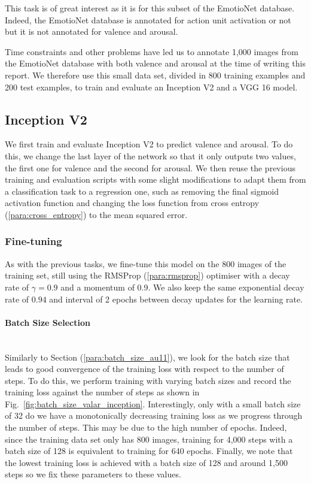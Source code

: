 \documentclass[12pt,twoside]{article}
\newcommand{\para}[1]{\paragraph{#1}\mbox{}\\}
\begin{document}
This task is of great interest as it is for this subset of the EmotioNet
database. Indeed, the EmotioNet database is annotated for action unit
activation or not but it is not annotated for valence and arousal.

Time constraints and other problems have led us to annotate 1,000 images from
the EmotioNet database with both valence and arousal at the time of writing
this report. We therefore use this small data set, divided in 800 training
examples and 200 test examples, to train and evaluate an Inception V2 and a VGG
16 model.

\subsection{Inception V2}\label{sec:valar_inception_v2}

We first train and evaluate Inception V2 to predict valence and arousal. To do
this, we change the last layer of the network so that it only outputs two
values, the first one for valence and the second for arousal. We then reuse
the previous training and evaluation scripts with some slight modifications to
adapt them from a classification task to a regression one, such as removing the
final sigmoid activation function and changing the loss function from cross
entropy (\ref{para:cross_entropy}) to the mean squared error.

\subsubsection{Fine-tuning}\label{sec:valar_fine}

As with the previous tasks, we fine-tune this model on the 800 images of the
training set, still using the RMSProp (\ref{para:rmsprop}) optimiser with a
decay rate of $\gamma = 0.9$ and a momentum of 0.9. We also keep the same
exponential decay rate of $0.94$ and interval of 2 epochs between decay updates
for the learning rate.

\para{Batch Size Selection}

Similarly to Section (\ref{para:batch_size_au11}), we look for the batch size
that leads to good convergence of the training loss with respect to the number
of steps. To do this, we perform training with varying batch sizes and record
the training loss against the number of steps as shown in
Fig.~\ref{fig:batch_size_valar_inception}. Interestingly, only with a small
batch size of 32 do we have a monotonically decreasing training loss as we
progress through the number of steps. This may be due to the high number of
epochs. Indeed, since the training data set only has 800 images, training for
4,000 steps with a batch size of 128 is equivalent to training for 640 epochs.
Finally, we note that the lowest training loss is achieved with a batch size of
128 and around 1,500 steps so we fix these parameters to these values.
\end{document}
